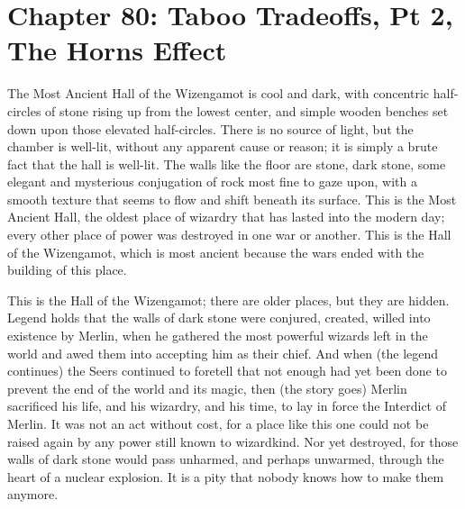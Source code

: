 \chapter{Chapter 80: Taboo Tradeoffs, Pt 2, The Horns Effect}
The Most Ancient Hall of the Wizengamot is cool and dark, with concentric half-circles of stone rising up from the lowest center, and simple wooden benches set down upon those elevated half-circles. There is no source of light, but the chamber is well-lit, without any apparent cause or reason; it is simply a brute fact that the hall is well-lit. The walls like the floor are stone, dark stone, some elegant and mysterious conjugation of rock most fine to gaze upon, with a smooth texture that seems to flow and shift beneath its surface. This is the Most Ancient Hall, the oldest place of wizardry that has lasted into the modern day; every other place of power was destroyed in one war or another. This is the Hall of the Wizengamot, which is most ancient because the wars ended with the building of this place.

This is the Hall of the Wizengamot; there are older places, but they are hidden. Legend holds that the walls of dark stone were conjured, created, willed into existence by Merlin, when he gathered the most powerful wizards left in the world and awed them into accepting him as their chief. And when (the legend continues) the Seers continued to foretell that not enough had yet been done to prevent the end of the world and its magic, then (the story goes) Merlin sacrificed his life, and his wizardry, and his time, to lay in force the Interdict of Merlin. It was not an act without cost, for a place like this one could not be raised again by any power still known to wizardkind. Nor yet destroyed, for those walls of dark stone would pass unharmed, and perhaps unwarmed, through the heart of a nuclear explosion. It is a pity that nobody knows how to make them anymore.

